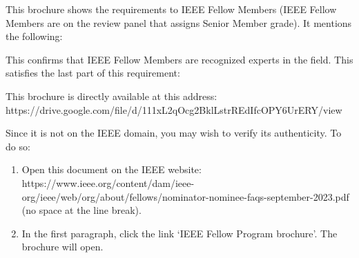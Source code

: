 
This brochure shows the requirements to IEEE Fellow Members
(IEEE Fellow Members are on the review panel that assigns Senior Member grade).
It mentions the following:


This confirms that IEEE Fellow Members are recognized experts in the field.
This satisfies the last part of this requirement:


This brochure is directly available at this address:\\
https://drive.google.com/file/d/111xL2qOcg2BklLstrREdIfcOPY6UrERY/view

Since it is not on the IEEE domain, you may wish to verify its authenticity.
To do so:

\begin{enumerate}

    \item Open this document on the IEEE website:\\
    https://www.ieee.org/content/dam/ieee-org/ieee/web/org/about/fellows/nominator-nominee-faqs-september-2023.pdf\\
    (no space at the line break).

    \item In the first paragraph, click the link `IEEE Fellow Program brochure'.
    The brochure will open.

\end{enumerate}

\begin{center}
\end{center}

\pagebreak
